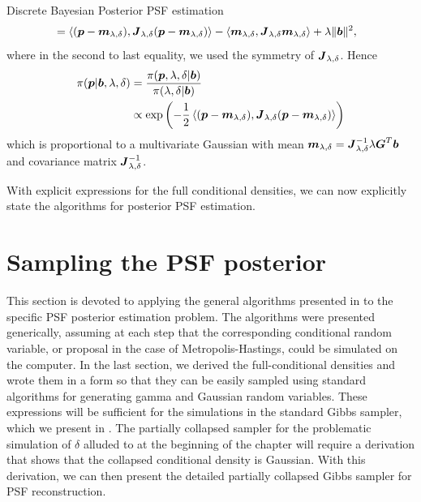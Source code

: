 \begin{chapter}{Discrete Bayesian Posterior PSF estimation}
\begin{align}
  &= \left\langle (\mbox{\boldmath$p$}-\mbox{\boldmath$m$}_{\lambda,\delta}),\mbox{\boldmath$J$}_{\lambda,\delta}(\mbox{\boldmath$p$} - \mbox{\boldmath$m$}_{\lambda,\delta})\right \rangle - \langle \mbox{\boldmath$m$}_{\lambda,\delta},\mbox{\boldmath$J$}_{\lambda,\delta}\mbox{\boldmath$m$}_{\lambda,\delta}\rangle + \lambda \|\mbox{\boldmath$b$}\|^2, \label{eq:completingSquare}
\end{align}
where in the second to last equality, we used the symmetry of $\mbox{\boldmath$J$}_{\lambda,\delta}$.
Hence 
\begin{align}
  \pi(\mbox{\boldmath$p$}|\mbox{\boldmath$b$},\lambda,\delta) 
    &= \frac{\pi(\mbox{\boldmath$p$},\lambda,\delta|\mbox{\boldmath$b$})}{\pi(\lambda,\delta|\mbox{\boldmath$b$}) } \nonumber\\
    &\propto \exp\left(-\frac 12\left\langle (\mbox{\boldmath$p$}-\mbox{\boldmath$m$}_{\lambda,\delta}),\mbox{\boldmath$J$}_{\lambda,\delta}(\mbox{\boldmath$p$} - \mbox{\boldmath$m$}_{\lambda,\delta})\right \rangle\right)\label{eq:gaussianLikelihood}
\end{align}
which is proportional to a multivariate Gaussian with mean $\mbox{\boldmath$m$}_{\lambda,\delta} = \mbox{\boldmath$J$}_{\lambda,\delta}^{-1}\lambda \mbox{\boldmath$G$}^T \mbox{\boldmath$b$}$ and covariance matrix $\mbox{\boldmath$J$}_{\lambda,\delta}^{-1}$.

With explicit expressions for the full conditional densities, we can now explicitly state the algorithms for posterior PSF estimation.

\section{Sampling the PSF posterior}

This section is devoted to applying the general algorithms presented in  to the specific PSF posterior estimation problem.  
The algorithms were presented generically, assuming at each step that the corresponding conditional random variable, or proposal in the case of Metropolis-Hastings, could be simulated on the computer.
In the last section, we derived the full-conditional densities and wrote them in a form so that they can be easily sampled using standard algorithms for generating gamma and Gaussian random variables.
These expressions will be sufficient for the simulations in the standard Gibbs sampler, which we present in .
The partially collapsed sampler for the problematic simulation of $\delta$ alluded to at the beginning of the chapter will require a derivation that shows that the collapsed conditional density is Gaussian.
With this derivation, we can then present the detailed partially collapsed Gibbs sampler for PSF reconstruction.


\end{chapter}

